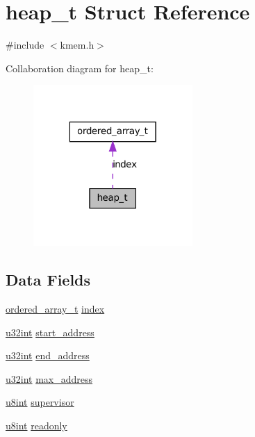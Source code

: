 \hypertarget{structheap__t}{
\section{heap\_\-t Struct Reference}
\label{structheap__t}
}


{\ttfamily \#include $<$kmem.h$>$}



Collaboration diagram for heap\_\-t:\nopagebreak
\begin{figure}[H]
\begin{center}
\leavevmode
\includegraphics[width=172pt]{structheap__t__coll__graph}
\end{center}
\end{figure}
\subsection*{Data Fields}
\begin{DoxyCompactItemize}
\item 
\hyperlink{structordered__array__t}{ordered\_\-array\_\-t} \hyperlink{structheap__t_a0eef4ef9a0236ead3069bdfd7a1998d4}{index}
\item 
\hyperlink{library_8h_ad7ecf93b77285d9bf039d27fa3f1a588}{u32int} \hyperlink{structheap__t_a82c233a1bbc072e5d6a04b9ec5188648}{start\_\-address}
\item 
\hyperlink{library_8h_ad7ecf93b77285d9bf039d27fa3f1a588}{u32int} \hyperlink{structheap__t_ad770aa56fce7e1ed44266a29def2234e}{end\_\-address}
\item 
\hyperlink{library_8h_ad7ecf93b77285d9bf039d27fa3f1a588}{u32int} \hyperlink{structheap__t_a846e12b614d724a6eddfebe50f200f5a}{max\_\-address}
\item 
\hyperlink{library_8h_a1026e682ffdadc1701c42cd44ce9efcf}{u8int} \hyperlink{structheap__t_adcd96884114847dfe3f1a765b4ee2ecc}{supervisor}
\item 
\hyperlink{library_8h_a1026e682ffdadc1701c42cd44ce9efcf}{u8int} \hyperlink{structheap__t_ae3dd1cfe611a922dc2f36557401a6d8f}{readonly}
\end{DoxyCompactItemize}



